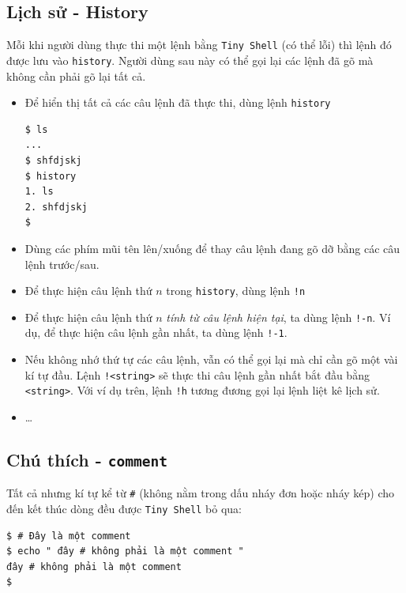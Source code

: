 \documentclass[a4paper,12pt]{report}
\begin{document}
        \subsection{Lịch sử - History}
        Mỗi khi người dùng thực thi một lệnh bằng \texttt{Tiny Shell} (có thể
        lỗi) thì lệnh đó được lưu vào \texttt{history}. Người dùng sau này có
        thể gọi lại các lệnh đã gõ mà không cần phải gõ lại tất cả.
        \begin{itemize}
            \item Để hiển thị tất cả các câu lệnh đã thực thi, dùng lệnh
                \texttt{history}
                \begin{verbatim}
$ ls
...
$ shfdjskj
$ history
1. ls
2. shfdjskj
$
                \end{verbatim}
            \item Dùng các phím mũi tên lên/xuống để thay câu lệnh đang gõ dỡ
                bằng các câu lệnh trước/sau.
            \item Để thực hiện câu lệnh thứ $n$ trong \texttt{history}, dùng
                lệnh \texttt{!n}
            \item Để thực hiện câu lệnh thứ $n$ \textit{tính từ câu lệnh hiện
                tại}, ta dùng lệnh \texttt{!-n}. Ví dụ, để thực hiện câu lệnh
                gần nhất, ta dùng lệnh \texttt{!-1}.
            \item Nếu không nhớ thứ tự các câu lệnh, vẫn có thể gọi lại mà chỉ
                cần gõ một vài kí tự đầu. Lệnh \texttt{!<string>} sẽ thực thi
                câu lệnh gần nhất bắt đầu bằng \texttt{<string>}. Với ví dụ
                trên, lệnh \texttt{!h} tương đương gọi lại lệnh liệt kê lịch
                sử.
            \item \ldots{}
        \end{itemize}

        \subsection{Chú thích - \texttt{comment}}
        Tất cả nhưng kí tự kể từ \texttt{\#} (không nằm trong dấu nháy đơn
        hoặc nháy kép) cho đến kết thúc dòng đều được \texttt{Tiny Shell}
        bỏ qua:
        \begin{verbatim}
$ # Đây là một comment
$ echo " đây # không phải là một comment "
đây # không phải là một comment
$
        \end{verbatim}

\end{document}
